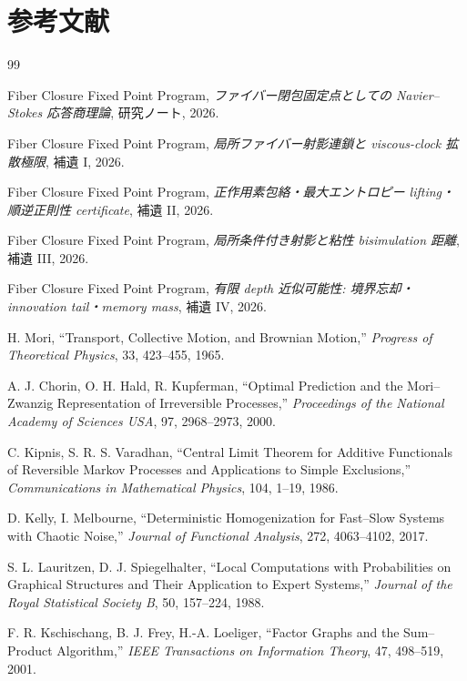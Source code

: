 \documentclass[11pt,a4paper,openany]{book}
\numberwithin{equation}{chapter}
\begin{document}
\chapter*{参考文献}
\begingroup
\small
\begin{thebibliography}{99}
\setlength{\itemsep}{0.35em}
\setlength{\parskip}{0pt}

Fiber Closure Fixed Point Program,
\emph{ファイバー閉包固定点としての Navier--Stokes 応答商理論},
研究ノート, 2026.

Fiber Closure Fixed Point Program,
\emph{局所ファイバー射影連鎖と viscous-clock 拡散極限},
補遺 I, 2026.

Fiber Closure Fixed Point Program,
\emph{正作用素包絡・最大エントロピー lifting・順逆正則性 certificate},
補遺 II, 2026.

Fiber Closure Fixed Point Program,
\emph{局所条件付き射影と粘性 bisimulation 距離},
補遺 III, 2026.

Fiber Closure Fixed Point Program,
\emph{有限 depth 近似可能性: 境界忘却・innovation tail・memory mass},
補遺 IV, 2026.

H. Mori,
``Transport, Collective Motion, and Brownian Motion,''
\emph{Progress of Theoretical Physics}, 33, 423--455, 1965.

A. J. Chorin, O. H. Hald, R. Kupferman,
``Optimal Prediction and the Mori--Zwanzig Representation of Irreversible Processes,''
\emph{Proceedings of the National Academy of Sciences USA}, 97, 2968--2973, 2000.

C. Kipnis, S. R. S. Varadhan,
``Central Limit Theorem for Additive Functionals of Reversible Markov Processes and Applications to Simple Exclusions,''
\emph{Communications in Mathematical Physics}, 104, 1--19, 1986.

D. Kelly, I. Melbourne,
``Deterministic Homogenization for Fast--Slow Systems with Chaotic Noise,''
\emph{Journal of Functional Analysis}, 272, 4063--4102, 2017.

S. L. Lauritzen, D. J. Spiegelhalter,
``Local Computations with Probabilities on Graphical Structures and Their Application to Expert Systems,''
\emph{Journal of the Royal Statistical Society B}, 50, 157--224, 1988.

F. R. Kschischang, B. J. Frey, H.-A. Loeliger,
``Factor Graphs and the Sum--Product Algorithm,''
\emph{IEEE Transactions on Information Theory}, 47, 498--519, 2001.


\end{thebibliography}
\end{document}
